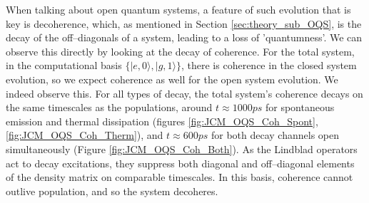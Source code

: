 \documentclass[11pt]{article}
\begin{document}
\noindent When talking about open quantum systems, a feature of such evolution that is key is decoherence, which, as mentioned in Section \ref{sec:theory_sub_OQS}, is the decay of the off--diagonals of a system, leading to a loss of 'quantumness'. We can observe this directly by looking at the decay of coherence. For the total system, in the computational basis $\{|e,0\rangle, |g,1\rangle\}$, there is coherence in the closed system evolution, so we expect coherence as well for the open system evolution. We indeed observe this. For all types of decay, the total system's coherence decays on the same timescales as the populations, around $t \approx 1000ps$ for spontaneous emission and thermal dissipation (figures \ref{fig:JCM_OQS_Coh_Spont}, \ref{fig:JCM_OQS_Coh_Therm}), and $ t \approx 600ps$ for both decay channels open simultaneously (Figure \ref{fig:JCM_OQS_Coh_Both}). As the Lindblad operators act to decay excitations, they suppress both diagonal and off–diagonal elements of the density matrix on comparable timescales. In this basis, coherence cannot outlive population, and so the system decoheres.\\
\\
\end{document}
